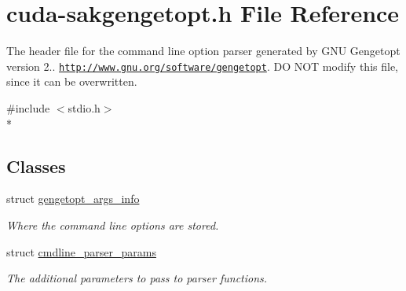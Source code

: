 \hypertarget{cuda-sakgengetopt_8h}{\section{cuda-\/sakgengetopt.h File Reference}
\label{cuda-sakgengetopt_8h}
}


The header file for the command line option parser generated by G\-N\-U Gengetopt version 2.. \href{http://www.gnu.org/software/gengetopt}{\tt http\-://www.\-gnu.\-org/software/gengetopt}. D\-O N\-O\-T modify this file, since it can be overwritten.  


{\ttfamily \#include $<$stdio.\-h$>$}\\*
\subsection*{Classes}
\begin{DoxyCompactItemize}
\item 
struct \hyperlink{structgengetopt__args__info}{gengetopt\-\_\-args\-\_\-info}
\begin{DoxyCompactList}\small\item\em Where the command line options are stored. \end{DoxyCompactList}\item 
struct \hyperlink{structcmdline__parser__params}{cmdline\-\_\-parser\-\_\-params}
\begin{DoxyCompactList}\small\item\em The additional parameters to pass to parser functions. \end{DoxyCompactList}\end{DoxyCompactItemize}
